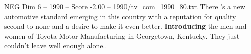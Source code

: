 \begin{textsample}{NEG Dim 6 – 1990 – Score -2.00 – 1990/tv\_com\_1990\_80.txt}  \label{ex:f6_neg_022}
There 's a new automotive standard emerging in this country with a reputation for quality second to none and a desire to make it even better. \textbf{Introducing} the men and women of Toyota Motor Manufacturing in Georgetown, Kentucky.
They just couldn't leave well enough alone..

\end{textsample}
